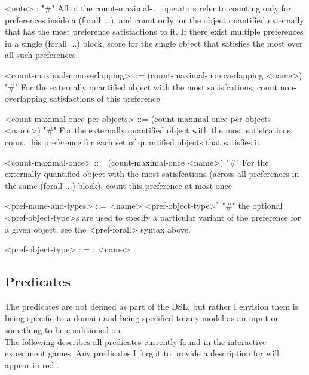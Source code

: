\documentclass{article}
\begin{document}
\begin{grammar}
<note> : "#" All of the count-maximal-... operators refer to counting only for preferences inside a (forall ...), and count only for the object quantified externally that has the most preference satisfactions to it. If there exist multiple preferences in a single (forall ...) block, score for the single object that satisfies the most over all such preferences.

<count-maximal-nonoverlapping> ::= (count-maximal-nonoverlapping <name>) "#" For the externally quantified object with the most satisfcations, count non-overlapping satisfactions of this preference

<count-maximal-once-per-objects> ::= (count-maximal-once-per-objects <name>) "#" For the externally quantified object with the most satisfcations, count this preference for each set of quantified objects that satisfies it

<count-maximal-once> ::= (count-maximal-once <name>) "#" For the externally quantified object with the most satisfcations (across all preferences in the same (forall ...) block), count this preference at most once

<pref-name-and-types> ::= <name> <pref-object-type>$^*$ "#" the optional <pref-object-type>s are used to specify a particular variant of the preference for a given object, see the <pref-forall> syntax above.

    <pref-object-type> ::= : <name>
    



\end{grammar}



\subsection{Predicates}
The predicates are not defined as part of the DSL, but rather I envision them is being specific to a domain and being specified to any model as an input or something to be conditioned on. \\
            
            The following describes all predicates currently found in the interactive experiment games. Any predicates I forgot to provide a description for will appear in { \color{red} red }.
        
\end{document}
